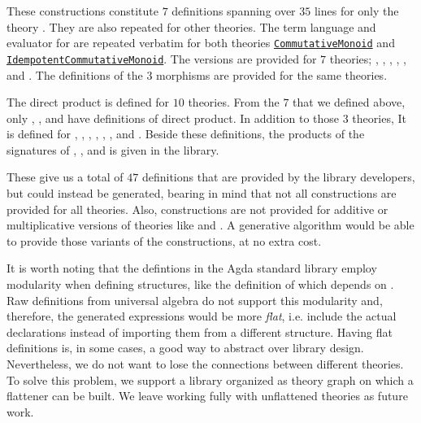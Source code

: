 These constructions constitute $7$ definitions spanning over $35$ lines for only the theory . They are also repeated for other theories. The term language and evaluator for  are repeated verbatim for both theories 
\href{https://github.com/agda/agda-stdlib/blob/c61b159363ce2390049ce8e1e5422f61f17ec3b7/src/Algebra/Solver/CommutativeMonoid.agda}
{\lstinline|CommutativeMonoid|}
and 
\href{https://github.com/agda/agda-stdlib/blob/c61b159363ce2390049ce8e1e5422f61f17ec3b7/src/Algebra/Solver/IdempotentCommutativeMonoid.agda}
{\lstinline|IdempotentCommutativeMonoid|}. The  versions are provided for $7$ theories; , , , , , and . The definitions of the $3$ morphisms are provided for the same theories. 

The direct product is defined for $10$ theories. From the $7$ that we defined above, only , , and  have definitions of direct product. In addition to those $3$ theories, It is defined for , , , , , , and . Beside these definitions, the products of the signatures of , , and  is given in the library.  

These give us a total of $47$ definitions that are provided by the library developers, but could instead be generated, bearing in mind that not all constructions are provided for all theories. Also, constructions are not provided for additive or multiplicative versions of theories like  and . A generative algorithm would be able to provide those variants of the constructions, at no extra cost. 

It is worth noting that the defintions in the Agda standard library employ modularity when defining structures, like the definition of  which depends on . Raw definitions from universal algebra do not support this modularity and, therefore, the generated expressions would be more \emph{flat}, i.e. include the actual declarations instead of importing them from a different structure. Having flat definitions is, in some cases, a good way to abstract over library design. Nevertheless, we do not want to lose the connections between different theories. To solve this problem, we support a library organized as theory graph on which a flattener can be built. We leave working fully with unflattened theories as future work.  

